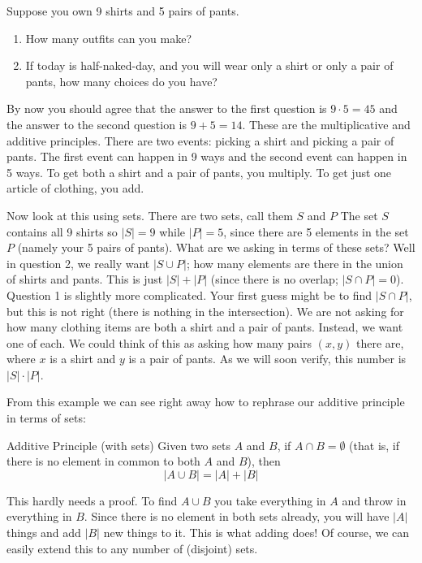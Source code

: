 \documentclass[12pt]{article}
\begin{document}
\begin{example}
 Suppose you own 9 shirts and 5 pairs of pants.
 \begin{enumerate}
  \item How many outfits can you make?
  \item If today is half-naked-day, and you will wear only a shirt or only a pair of pants, how many choices do you have?
 \end{enumerate}
\begin{solution}
 By now you should agree that the answer to the first question is $9 \cdot 5 = 45$ and the answer to the second question is $9 + 5 = 14$.  These are the multiplicative and additive principles.  There are two events: picking a shirt and picking a pair of pants.  The first event can happen in 9 ways and the second event can happen in 5 ways.  To get both a shirt and a pair of pants, you multiply.  To get just one article of clothing, you add.
 
 Now look at this using sets.  There are two sets, call them $S$ and $P$  The set $S$ contains all 9 shirts so $|S| = 9$ while $|P| = 5$, since there are 5 elements in the set $P$ (namely your 5 pairs of pants).  What are we asking in terms of these sets?  Well in question 2, we really want $|S \cup P|$; how many elements are there in the union of shirts and pants.  This is just $|S| + |P|$ (since there is no overlap; $|S \cap P| = 0$).  Question 1 is slightly more complicated.  Your first guess might be to find $|S \cap P|$, but this is not right (there is nothing in the intersection).  We are not asking for how many clothing items are both a shirt and a pair of pants.  Instead, we want one of each.  We could think of this as asking how many pairs $(x,y)$ there are, where $x$ is a shirt and $y$ is a pair of pants.  As we will soon verify, this number is $|S| \cdot |P|$.
\end{solution}
\end{example}

From this example we can see right away how to rephrase our additive principle in terms of sets:

\begin{defbox}{Additive Principle (with sets)}
Given two sets $A$ and $B$, if $A \cap B = \emptyset$ (that is, if there is no element in common to both $A$ and $B$), then
\[|A \cup B| = |A| + |B|\]
\end{defbox}

This hardly needs a proof.  To find $A \cup B$ you take everything in $A$ and throw in everything in $B$.  Since there is no element in both sets already, you will have $|A|$ things and add $|B|$ new things to it.  This is what adding does!  Of course, we can easily extend this to any number of (disjoint) sets.
\end{document}
